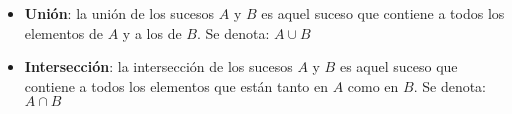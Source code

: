 \setlength{\parskip}{5mm}
\begin{itemize}
\item \textbf{Unión}: la unión de los sucesos $A$ y $B$ es aquel suceso que contiene a todos los elementos de $A$ y a  los de $B$. Se denota: $A\cup B$ 


\item \textbf{Intersección}: la intersección de los sucesos $A$ y $B$ es aquel suceso que contiene a todos los elementos que están tanto en $A$ como en $B$. Se denota: $A\cap B$ 
 
\end{itemize}

